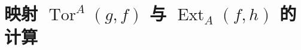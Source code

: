 \section{映射 \texorpdfstring{$\operatorname{Tor}^{A}(g,f)$}{TorA(g,f)} 与 \texorpdfstring{$\operatorname{Ext}_{A}(f,h)$}{ExtA(f,h)} 的计算}
